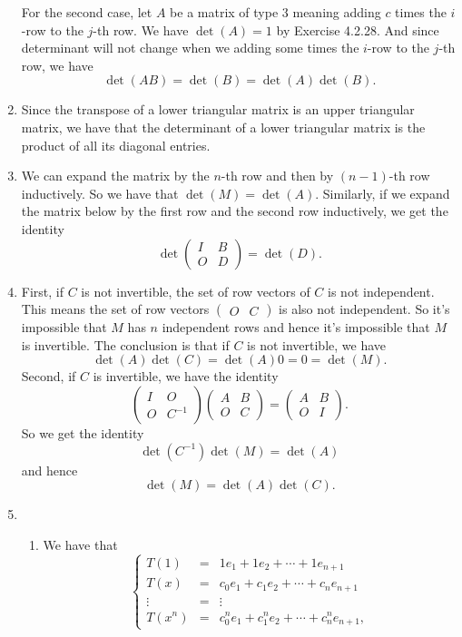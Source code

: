 \begin{enumerate}
For the second case, let $A$ be a matrix of type 3 meaning adding $c$ times the $i$-row to the $j$-th row. We have $\det(A)=1$ by Exercise 4.2.28. And since determinant will not change when we adding some times the $i$-row to the $j$-th row, we have 
\[\det(AB)=\det(B)=\det(A)\det(B).\]
\item Since the transpose of a lower triangular matrix is an upper triangular matrix, we have that the determinant of a lower triangular matrix is the product of all its diagonal entries.
\item We can expand the matrix by the $n$-th row and then by $(n-1)$-th row inductively. So we have that $\det(M)=\det(A)$. Similarly, if we expand the matrix below by the first row and the second row inductively, we get the identity 
\[\det\begin{pmatrix}I&B\\O&D\end{pmatrix}=\det(D).\]
\item First, if $C$ is not invertible, the set of row vectors of $C$ is not independent. This means the set of row vectors $\begin{pmatrix}O&C\end{pmatrix}$ is also not independent. So it's impossible that $M$ has $n$ independent rows and hence it's impossible that $M$ is invertible. The conclusion is that if $C$ is not invertible, we have \[\det(A)\det(C)=\det(A)0=0=\det(M).\]
Second, if $C$ is invertible, we have the identity 
\[\begin{pmatrix}I&O\\O&C^{-1}\end{pmatrix}\begin{pmatrix}A&B\\O&C\end{pmatrix}=\begin{pmatrix}A&B\\O&I\end{pmatrix}.\]
So we get the identity
\[\det(C^{-1})\det(M)=\det(A)\]
and hence
\[\det(M)=\det(A)\det(C).\]
\item \begin{enumerate}
\item We have that 
\[\left\{\begin{array}{ccc}
T(1)&=&1e_1+1e_2+\cdots +1e_{n+1}\\
T(x)&=&c_0e_1+c_1e_2+\cdots +c_ne_{n+1}\\
\vdots &=& \vdots \\
T(x^n)&=&c_0^ne_1+c_1^ne_2+\cdots +c_n^ne_{n+1},
\end{array}\right.\]

\end{enumerate}
\end{enumerate}

